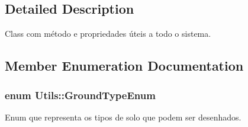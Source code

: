 \subsection{Detailed Description}
Class com método e propriedades úteis a todo o sistema. 

\subsection{Member Enumeration Documentation}
\hypertarget{class_utils_af02e975129bf6ed7b10da91fbf5d2723}{
\subsubsection[{Ground\+Type\+Enum}]{\setlength{\rightskip}{0pt plus 5cm}enum {\bf Utils\+::\+Ground\+Type\+Enum}}}\label{class_utils_af02e975129bf6ed7b10da91fbf5d2723}


Enum que representa os tipos de solo que podem ser desenhados. 


